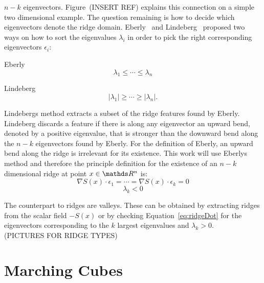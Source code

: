 $n-k$ eigenvectors. Figure~(INSERT REF) explains this connection on a
simple two dimensional example. The question remaining is how to decide
which eigenvectors denote the ridge domain. Eberly~\cite{Eberly} and
Lindeberg~\cite{Lindeberg} proposed two ways on how to sort the
eigenvalues $\lambda_i$ in order to pick the right corresponding
eigenvectors $\epsilon_i$:\\
\begin{inparaenum}[]
  \item Eberly
  \begin{equation}\label{eq:Eberly}
   \lambda_1 \leq \cdots \leq \lambda_n
  \end{equation}
  \item Lindeberg
  \begin{equation}
    \lvert \lambda_1 \rvert \geq \cdots \geq \lvert \lambda_n \rvert.
  \end{equation}
\end{inparaenum}
\noindent Lindebergs method extracts a subset of the ridge features
found by Eberly. Lindeberg discards a feature if there is along any
eigenvector an upward bend, denoted by a positive eigenvalue, that is
stronger than the downward bend along the $n-k$ eigenvectors found by
Eberly. For the definition of Eberly, an upward bend along the ridge is
irrelevant for its existence. This work will use Eberlys method and
therefore the principle definition for the existence of an $n-k$
dimensional ridge at point $x \in \real^n$ is:\\

\begin{equation}\label{eq:ridgeDot}
  \nabla S(x) \cdot \epsilon_1 = \cdots = \nabla S(x) \cdot \epsilon_{k} = 0
\end{equation}
\begin{equation}\label{eq:ridgeEV}
  \lambda_k < 0
\end{equation}

\noindent The counterpart to ridges are valleys. These can be obtained
by extracting ridges from the scalar field $-S(x)$ or by checking
Equation~\ref{eq:ridgeDot} for the eigenvectors corresponding to the
$k$ largest eigenvalues and $\lambda_k > 0$.
\\(PICTURES FOR RIDGE TYPES)

\section{Marching Cubes}

